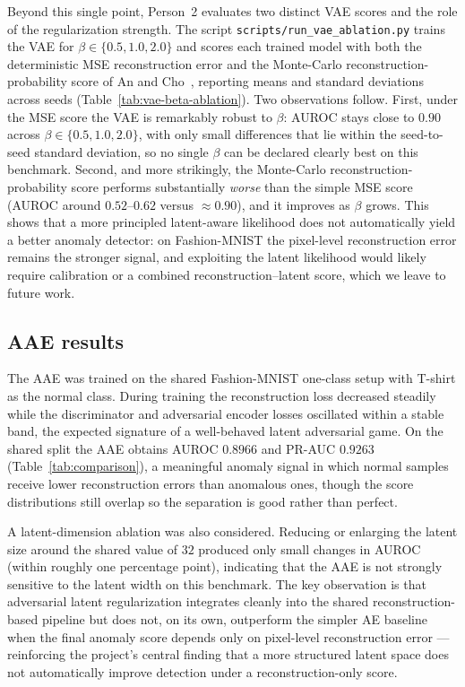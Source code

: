 \documentclass[11pt]{article}
\begin{document}
Beyond this single point, Person~2 evaluates two distinct VAE scores and the role
of the regularization strength. The script \texttt{scripts/run\_vae\_ablation.py}
trains the VAE for $\beta\in\{0.5,1.0,2.0\}$ and scores each trained model with
both the deterministic MSE reconstruction error and the Monte-Carlo
reconstruction-probability score of An and Cho~\cite{ancho2015}, reporting means
and standard deviations across seeds (Table~\ref{tab:vae-beta-ablation}). Two
observations follow. First, under the MSE score the VAE is remarkably robust to
$\beta$: AUROC stays close to $0.90$ across $\beta\in\{0.5,1.0,2.0\}$, with only
small differences that lie within the seed-to-seed standard deviation, so no
single $\beta$ can be declared clearly best on this benchmark. Second, and more
strikingly, the Monte-Carlo reconstruction-probability score performs
substantially \emph{worse} than the simple MSE score (AUROC around $0.52$--$0.62$
versus $\approx0.90$), and it improves as $\beta$ grows. This shows that a more
principled latent-aware likelihood does not automatically yield a better anomaly
detector: on Fashion-MNIST the pixel-level reconstruction error remains the
stronger signal, and exploiting the latent likelihood would likely require
calibration or a combined reconstruction--latent score, which we leave to future
work.



\subsection{AAE results}   %
The AAE was trained on the shared Fashion-MNIST one-class setup with T-shirt as
the normal class. During training the reconstruction loss decreased steadily
while the discriminator and adversarial encoder losses oscillated within a
stable band, the expected signature of a well-behaved latent adversarial game.
On the shared split the AAE obtains AUROC $0.8966$ and PR-AUC $0.9263$
(Table~\ref{tab:comparison}), a meaningful anomaly signal in which normal samples
receive lower reconstruction errors than anomalous ones, though the score
distributions still overlap so the separation is good rather than perfect.

A latent-dimension ablation was also considered. Reducing or enlarging the latent
size around the shared value of $32$ produced only small changes in AUROC
(within roughly one percentage point), indicating that the AAE is not strongly
sensitive to the latent width on this benchmark. The key observation is that
adversarial latent regularization integrates cleanly into the shared
reconstruction-based pipeline but does not, on its own, outperform the simpler AE
baseline when the final anomaly score depends only on pixel-level reconstruction
error --- reinforcing the project's central finding that a more structured latent
space does not automatically improve detection under a reconstruction-only score.
\end{document}
